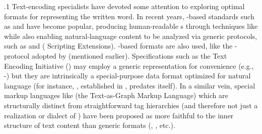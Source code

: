 \documentclass[11pt, twocolumn]{article}
\begin{document}
\p.1{%
Text-encoding specialists have devoted some attention
to exploring optimal formats
for representing the written word. In recent years,
-based standards such as  and  have become
popular, producing human-readable s through techniques
like  while also enabling natural-language
content to be analyzed via generic  protocols, such as
 and  ( Scripting Extensions). \lJSON{}-based
formats are also used, like the - protocol adopted
by \CORDOneNine{} (mentioned earlier). Specifications such as the
Text Encoding Initiative () may employ a generic
representation for convenience (e.g., -) but they are
intrinsically a special-purpose data format optimized
for natural language (for instance, , established
in , predates  itself). In a similar vein,
special markup languages like  (the Text-as-Graph
Markup Language) \mdash{} which are structurally
distinct from straightforward tag hierarchies (and therefore
not just a realization or dialect of ) \mdash{} have been proposed as more faithful
to the inner structure of text content than generic
formats (, , etc.).
}%
\end{document}
